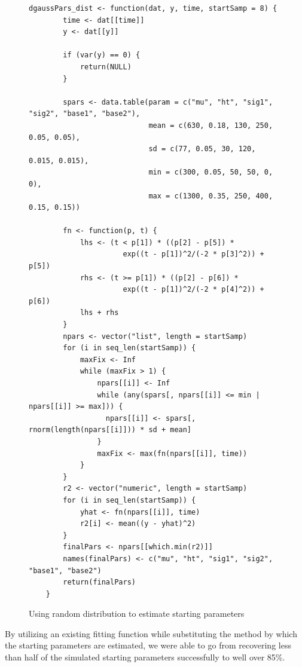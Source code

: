 \begin{singlespace}
\begin{figure}[H]
\centering
\begin{BVerbatim}
dgaussPars_dist <- function(dat, y, time, startSamp = 8) {
        time <- dat[[time]]
        y <- dat[[y]]
        
        if (var(y) == 0) {
            return(NULL)
        }
        
        spars <- data.table(param = c("mu", "ht", "sig1", "sig2", "base1", "base2"),
                            mean = c(630, 0.18, 130, 250, 0.05, 0.05), 
                            sd = c(77, 0.05, 30, 120, 0.015, 0.015), 
                            min = c(300, 0.05, 50, 50, 0, 0), 
                            max = c(1300, 0.35, 250, 400, 0.15, 0.15))
        
        fn <- function(p, t) {
            lhs <- (t < p[1]) * ((p[2] - p[5]) * 
                      exp((t - p[1])^2/(-2 * p[3]^2)) + p[5])
            rhs <- (t >= p[1]) * ((p[2] - p[6]) * 
                      exp((t - p[1])^2/(-2 * p[4]^2)) + p[6])
            lhs + rhs
        }
        npars <- vector("list", length = startSamp)
        for (i in seq_len(startSamp)) {
            maxFix <- Inf
            while (maxFix > 1) {
                npars[[i]] <- Inf
                while (any(spars[, npars[[i]] <= min | npars[[i]] >= max])) {
                  npars[[i]] <- spars[, rnorm(length(npars[[i]])) * sd + mean]
                }
                maxFix <- max(fn(npars[[i]], time))
            }
        }
        r2 <- vector("numeric", length = startSamp)
        for (i in seq_len(startSamp)) {
            yhat <- fn(npars[[i]], time)
            r2[i] <- mean((y - yhat)^2)
        }
        finalPars <- npars[[which.min(r2)]]
        names(finalPars) <- c("mu", "ht", "sig1", "sig2", "base1", "base2")
        return(finalPars)
    }
\end{BVerbatim}
\caption{Using random distribution to estimate starting parameters}
\label{fig:gauss_form_dist}
\end{figure}
\end{singlespace}

By utilizing an existing fitting function while substituting the method by which the starting parameters are estimated, we were able to go from recovering less than half of the simulated starting parameters successfully to well over 85\%.


